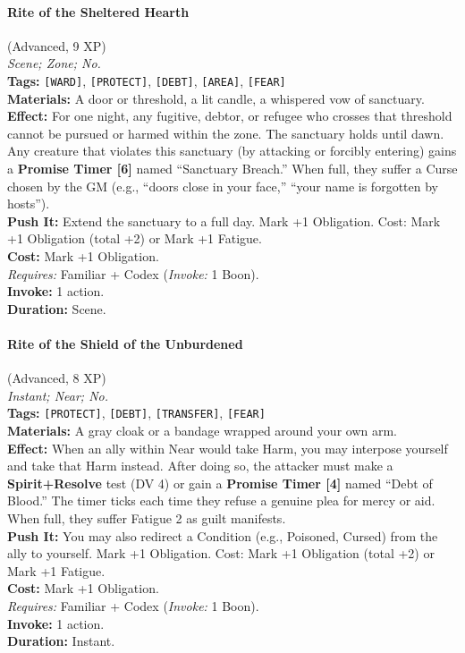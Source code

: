 \paragraph{Rite of the Sheltered Hearth} (Advanced, 9 XP) \hfill \\
\emph{Scene; Zone; No.} \\
\textbf{Tags:} \texttt{[WARD]}, \texttt{[PROTECT]}, \texttt{[DEBT]}, \texttt{[AREA]}, \texttt{[FEAR]} \\
\textbf{Materials:} A door or threshold, a lit candle, a whispered vow of sanctuary. \\
\textbf{Effect:} For one night, any fugitive, debtor, or refugee who crosses that threshold cannot be pursued or harmed within the zone. The sanctuary holds until dawn. Any creature that violates this sanctuary (by attacking or forcibly entering) gains a \textbf{Promise Timer [6]} named ``Sanctuary Breach.'' When full, they suffer a Curse chosen by the GM (e.g., ``doors close in your face,'' ``your name is forgotten by hosts''). \\
\textbf{Push It:} Extend the sanctuary to a full day. Mark +1 Obligation. Cost: Mark +1 Obligation (total +2) or Mark +1 Fatigue. \\
\textbf{Cost:} Mark +1 Obligation. \\
\textit{Requires:} Familiar + Codex (\textit{Invoke:} 1 Boon). \\
\textbf{Invoke:} 1 action. \\
\textbf{Duration:} Scene.

\paragraph{Rite of the Shield of the Unburdened} (Advanced, 8 XP) \hfill \\
\emph{Instant; Near; No.} \\
\textbf{Tags:} \texttt{[PROTECT]}, \texttt{[DEBT]}, \texttt{[TRANSFER]}, \texttt{[FEAR]} \\
\textbf{Materials:} A gray cloak or a bandage wrapped around your own arm. \\
\textbf{Effect:} When an ally within Near would take Harm, you may interpose yourself and take that Harm instead. After doing so, the attacker must make a \textbf{Spirit+Resolve} test (DV 4) or gain a \textbf{Promise Timer [4]} named ``Debt of Blood.'' The timer ticks each time they refuse a genuine plea for mercy or aid. When full, they suffer Fatigue 2 as guilt manifests. \\
\textbf{Push It:} You may also redirect a Condition (e.g., Poisoned, Cursed) from the ally to yourself. Mark +1 Obligation. Cost: Mark +1 Obligation (total +2) or Mark +1 Fatigue. \\
\textbf{Cost:} Mark +1 Obligation. \\
\textit{Requires:} Familiar + Codex (\textit{Invoke:} 1 Boon). \\
\textbf{Invoke:} 1 action. \\
\textbf{Duration:} Instant.

